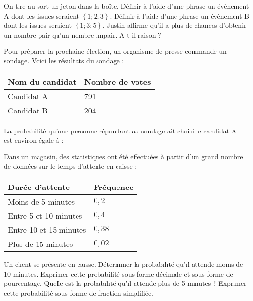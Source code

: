 \documentclass["../Cours.tex"]{subfiles}
\begin{document}
\begin{questions}
    On tire au sort un jeton dans la boîte.
    \question Définir à l'aide d'une phrase un évènement A dont les issues seraient $\left\{ 1;2;3 \right\}$.
    \question Définir à l'aide d'une phrase un évènement B dont les issues seraient $\left\{ 1;3;5 \right\}$.
    \question Justin affirme qu'il a plus de chances d'obtenir un nombre pair qu'un nombre impair. A-t-il raison ?

    \exercice Pour préparer la prochaine élection, un organisme de presse commande un sondage. Voici les résultats du sondage :
    \begin{center}
        \begin{tabularx}{0.5\linewidth}{|X|X|}\hline
            Nom du candidat & Nombre de votes \\ \hline
            Candidat A & 791 \\ \hline
            Candidat B & 204 \\ \hline
        \end{tabularx}
    \end{center}
    \question La probabilité qu'une personne répondant au sondage ait choisi le candidat A \\est environ égale à :

    \exercice Dans un magasin, des statistiques ont été effectuées à partir d'un grand nombre de données sur le temps d'attente en caisse :
    \begin{center}
        \begin{tabularx}{0.5\linewidth}{|X|X|}\hline 
            Durée d'attente & Fréquence \\\hline
            Moins de 5 minutes & $0,2$ \\\hline 
            Entre 5 et 10 minutes & $0,4$ \\\hline
            Entre 10 et 15 minutes & $0,38$ \\\hline 
            Plus de 15 minutes & $0,02$ \\\hline
        \end{tabularx}
    \end{center}

    Un client se présente en caisse.
    \question Déterminer la probabilité qu'il attende moins de 10 minutes. Exprimer cette probabilité sous forme décimale et sous forme de pourcentage.
    \question Quelle est la probabilité qu'il attende plus de 5 minutes ? Exprimer cette probabilité sous forme de fraction simplifiée.


\end{questions}
\end{document}
